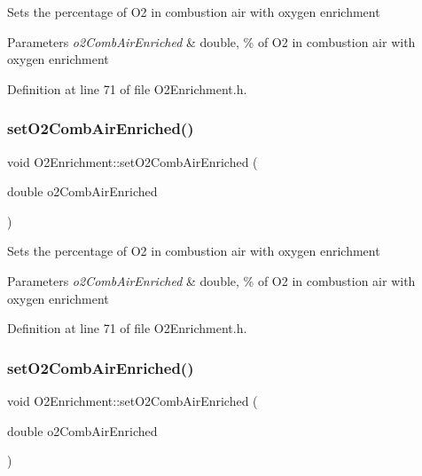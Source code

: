 Sets the percentage of O2 in combustion air with oxygen enrichment 
\begin{DoxyParams}{Parameters}
{\em o2\+Comb\+Air\+Enriched} & double, \% of O2 in combustion air with oxygen enrichment \\
\hline
\end{DoxyParams}


Definition at line 71 of file O2\+Enrichment.\+h.

\mbox{\label{class_o2_enrichment_af781223d8201c4e5a1d0085718b0b36c}} 
\subsubsection{\texorpdfstring{set\+O2\+Comb\+Air\+Enriched()}{setO2CombAirEnriched()}\hspace{0.1cm}{\footnotesize\ttfamily [2/3]}}
{\footnotesize\ttfamily void O2\+Enrichment\+::set\+O2\+Comb\+Air\+Enriched (\begin{DoxyParamCaption}\item[{double}]{o2\+Comb\+Air\+Enriched }\end{DoxyParamCaption})\hspace{0.3cm}{\ttfamily [inline]}}

Sets the percentage of O2 in combustion air with oxygen enrichment 
\begin{DoxyParams}{Parameters}
{\em o2\+Comb\+Air\+Enriched} & double, \% of O2 in combustion air with oxygen enrichment \\
\hline
\end{DoxyParams}


Definition at line 71 of file O2\+Enrichment.\+h.

\mbox{\label{class_o2_enrichment_af781223d8201c4e5a1d0085718b0b36c}} 
\subsubsection{\texorpdfstring{set\+O2\+Comb\+Air\+Enriched()}{setO2CombAirEnriched()}\hspace{0.1cm}{\footnotesize\ttfamily [3/3]}}
{\footnotesize\ttfamily void O2\+Enrichment\+::set\+O2\+Comb\+Air\+Enriched (\begin{DoxyParamCaption}\item[{double}]{o2\+Comb\+Air\+Enriched }\end{DoxyParamCaption})\hspace{0.3cm}{\ttfamily [inline]}}

